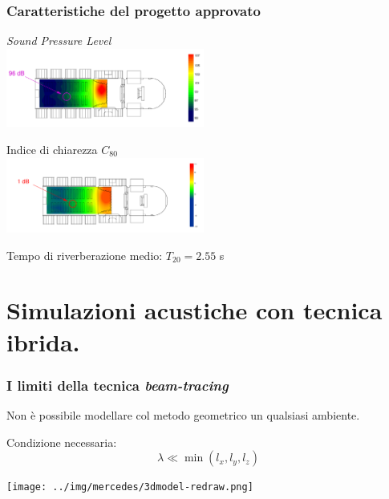 \documentclass[10pt]{beamer}
\begin{document}
\begin{frame}
  \frametitle{Caratteristiche del progetto approvato}

  \begin{center}
    \em Sound Pressure Level \em\\
    \includegraphics[width = 6.5cm]{graph/sv-final-Leq-A-slides.pdf}\\
    \vskip 0.3cm

    Indice di chiarezza $C_{80}$ \\
    \includegraphics[width = 6.5cm]{graph/sv-final-c80-1k-slides.pdf}\\
    \vskip 0.3cm

    Tempo di riverberazione medio: $T_{20} = 2.55$ s
  \end{center}

\end{frame}


\section{Simulazioni acustiche con tecnica ibrida.}

\begin{frame}
  \frametitle{I limiti della tecnica \emph{beam-tracing}}

  Non \`e possibile modellare col metodo geometrico un qualsiasi ambiente.\\

  \begin{block}{Condizione necessaria:}
    \begin{displaymath}
      \lambda \ll \min (l_x, l_y, l_z)
    \end{displaymath}
  \end{block}
  
  \pause

  \begin{center}
    \texttt{[image: ../img/mercedes/3dmodel-redraw.png]}
  \end{center}

\end{frame}
\end{document}
